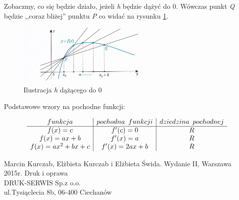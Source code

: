 \documentclass[12pt]{article}
\begin{document}
Zobaczmy, co się będzie działo, jeżeli \textit{h} będzie dążyć do 0. Wówczas punkt \textit{Q} będzie ,,coraz bliżej'' punktu \textit{P} co widać na rysunku \ref{rys2_model}. 
\begin{figure}[ht]
\begin{center}
\includegraphics[height=3cm]{zdj2.jpg}
\caption{Ilustracja \textit{h} dążącego do 0}
\label{rys2_model}
\end{center}
\end{figure}
\begin{center}
Podstawowe wzory na pochodne funkcji:
\end{center}
\[
\begin{array}{c|c|c}
funkcja & pochodna \hspace{5px} funkcji & dziedzina  \hspace{5px} pochodnej\\
\hline
f(x)=c & f'(c)= 0 & R \\
f(x) = ax + b & f'(x) = a & R\\
f(x) = ax^2 + bx + c & f'(x) = 2ax + b & R
\end{array}
\]
\newpage
\begin{thebibliography}{9}
Marcin Kurczab, Elżbieta Kurczab i Elżbieta Świda. Wydanie II, Warszawa 2015r.
Druk i oprawa\\
DRUK-SERWIS Sp.z o.o.\\
ul.Tysiąclecia 8b, 06-400 Ciechanów
\end{thebibliography}
\end{document}
